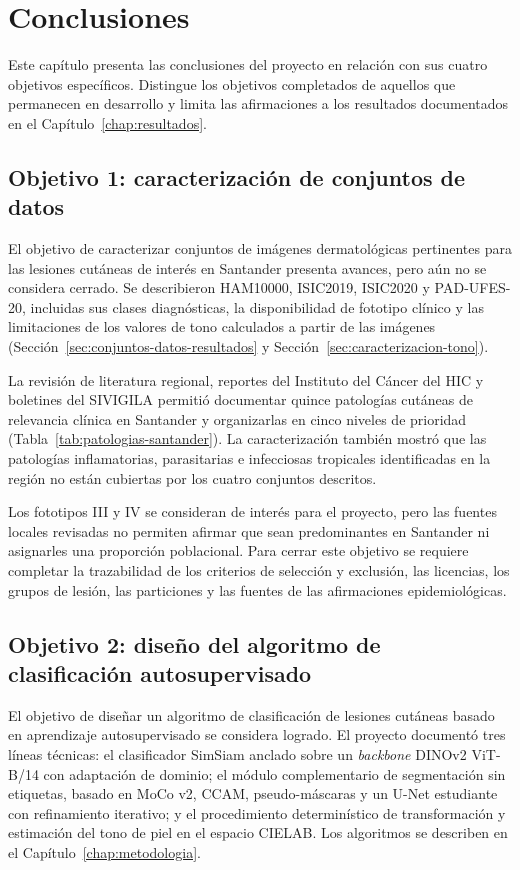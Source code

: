 \chapter{Conclusiones}\label{chap:conclusiones}

Este capítulo presenta las conclusiones del proyecto en relación con sus cuatro objetivos específicos. Distingue los objetivos completados de aquellos que permanecen en desarrollo y limita las afirmaciones a los resultados documentados en el Capítulo~\ref{chap:resultados}.

\section*{Objetivo 1: caracterización de conjuntos de datos}

El objetivo de caracterizar conjuntos de imágenes dermatológicas pertinentes para las lesiones cutáneas de interés en Santander presenta avances, pero aún no se considera cerrado. Se describieron HAM10000, ISIC2019, ISIC2020 y PAD-UFES-20, incluidas sus clases diagnósticas, la disponibilidad de fototipo clínico y las limitaciones de los valores de tono calculados a partir de las imágenes (Sección~\ref{sec:conjuntos-datos-resultados} y Sección~\ref{sec:caracterizacion-tono}).

La revisión de literatura regional, reportes del Instituto del Cáncer del HIC y boletines del SIVIGILA permitió documentar quince patologías cutáneas de relevancia clínica en Santander y organizarlas en cinco niveles de prioridad (Tabla~\ref{tab:patologias-santander}). La caracterización también mostró que las patologías inflamatorias, parasitarias e infecciosas tropicales identificadas en la región no están cubiertas por los cuatro conjuntos descritos.

Los fototipos III y IV se consideran de interés para el proyecto, pero las fuentes locales revisadas no permiten afirmar que sean predominantes en Santander ni asignarles una proporción poblacional. Para cerrar este objetivo se requiere completar la trazabilidad de los criterios de selección y exclusión, las licencias, los grupos de lesión, las particiones y las fuentes de las afirmaciones epidemiológicas.

\section*{Objetivo 2: diseño del algoritmo de clasificación autosupervisado}

El objetivo de diseñar un algoritmo de clasificación de lesiones cutáneas basado en aprendizaje autosupervisado se considera logrado. El proyecto documentó tres líneas técnicas: el clasificador SimSiam anclado sobre un \emph{backbone} DINOv2 ViT-B/14 con adaptación de dominio; el módulo complementario de segmentación sin etiquetas, basado en MoCo v2, CCAM, pseudo-máscaras y un U-Net estudiante con refinamiento iterativo; y el procedimiento determinístico de transformación y estimación del tono de piel en el espacio CIELAB. Los algoritmos se describen en el Capítulo~\ref{chap:metodologia}.

